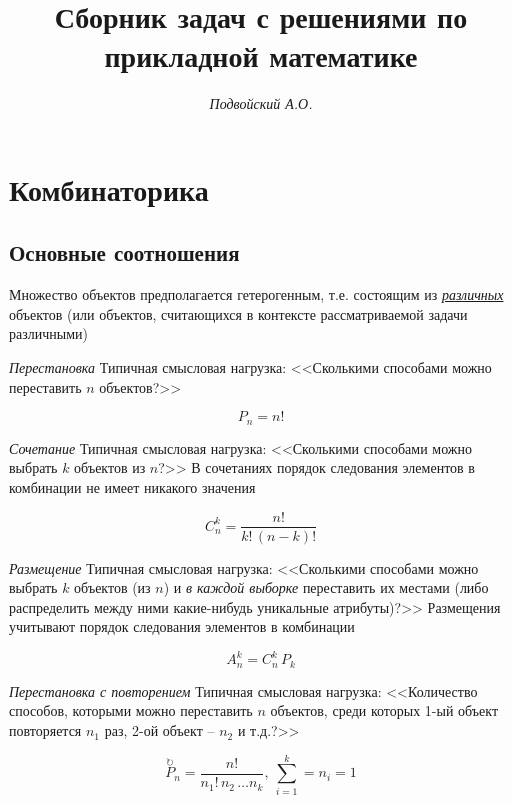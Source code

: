 \documentclass[%
	11pt,
	a4paper,
	utf8,
		]{article}
\begin{document}
\title{Сборник задач с решениями по прикладной математике}

\author{\itshape Подвойский А.О.}

\date{}
\maketitle

\thispagestyle{fancy}




\tableofcontents

\section{Комбинаторика}

\subsection{Основные соотношения}

Множество объектов предполагается гетерогенным, т.е. состоящим из \underline{\itshape различных} объектов (или объектов, считающихся в контексте рассматриваемой задачи различными)

\emph{Перестановка} Типичная смысловая нагрузка: <<Сколькими способами можно переставить $ n $ объектов?>>

$$ P_n = n! $$

\emph{Сочетание} Типичная смысловая нагрузка: <<Сколькими способами можно выбрать $ k $ объектов из $ n $?>> В сочетаниях порядок следования элементов в комбинации не имеет никакого значения

$$ C_n^k = \dfrac{n!}{k! \, (n-k)!} $$

\emph{Размещение} Типичная смысловая нагрузка: <<Сколькими способами можно выбрать $ k $ объектов (из $ n $) и \emph{в каждой выборке} переставить их местами (либо распределить между ними какие-нибудь уникальные атрибуты)?>> Размещения учитывают порядок следования элементов в комбинации

$$ A_n^k = C_n^k \, P_k $$

\emph{Перестановка с повторением} Типичная смысловая нагрузка: <<Количество способов, которыми можно переставить $ n $ объектов, среди которых 1-ый объект повторяется $ n_1 $ раз, 2-ой объект -- $ n_2 $ и т.д.?>>

$$ \stackrel{\circlearrowright}{P}_n = \dfrac{n!}{n_1! \, n_2 \, \ldots n_k}, \ \sum_{i=1}^k = n_i = 1 $$
\end{document}
